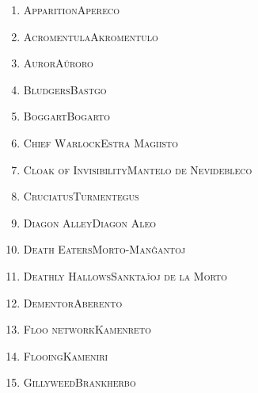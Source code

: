 \begin{enumerate}
\item\label{nomoj:apereco} \textsc{Apparition}\dotfill \textsc{Apereco}\\
\smallskip
\item\label{nomoj:akromentulo} \textsc{Acromentula}\dotfill \textsc{Akromentulo}\\
\smallskip
\item\label{nomoj:aŭroro} \textsc{Auror}\dotfill \textsc{Aŭroro}\\
\smallskip
\item\label{nomoj:bastgo} \textsc{Bludgers}\dotfill \textsc{Bastgo}\\
\smallskip
\item\label{nomoj:bogarto} \textsc{Boggart}\dotfill \textsc{Bogarto}\\
\smallskip
\item\label{nomoj:magiisto} \textsc{Chief Warlock}\dotfill \textsc{Estra Magiisto}\\
\smallskip
\item\label{nomoj:nevidebleco} \textsc{Cloak of Invisibility}\dotfill \textsc{Mantelo de Nevidebleco}\\
\smallskip
\item\label{nomoj:turmentegus} \textsc{Cruciatus}\dotfill \textsc{Turmentegus}\\
\smallskip
\item\label{nomoj:aleo} \textsc{Diagon Alley}\dotfill \textsc{Diagon Aleo}\\
\smallskip
\item\label{nomoj:manĝantoj} \textsc{Death Eaters}\dotfill \textsc{Morto-Manĝantoj}\\
\smallskip
\item\label{nomoj:sanktaĵo} \textsc{Deathly Hallows}\dotfill \textsc{Sanktaĵoj de la Morto}\\
\smallskip
\item\label{nomoj:aberento} \textsc{Dementor}\dotfill \textsc{Aberento}\\
\smallskip
\item\label{nomoj:kamenreto} \textsc{Floo network}\dotfill \textsc{Kamenreto}\\
\smallskip
\item\label{nomoj:kameniri} \textsc{Flooing}\dotfill \textsc{Kameniri}\\
\smallskip
\item\label{nomoj:brankherbo} \textsc{Gillyweed}\dotfill \textsc{Brankherbo}\\

\end{enumerate}
